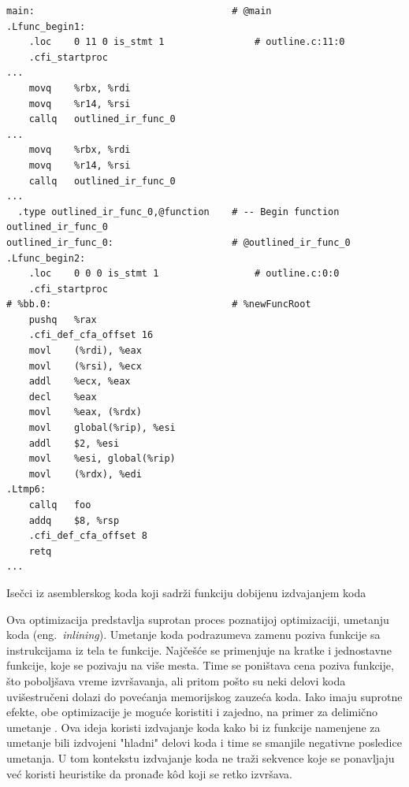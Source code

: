 \documentclass[12pt,oneside]{memoir}
\begin{document}
\begin{listing}[!ht]
\begin{verbatim}
main:                                   # @main
.Lfunc_begin1:
	.loc	0 11 0 is_stmt 1                # outline.c:11:0
	.cfi_startproc
...
	movq	%rbx, %rdi
	movq	%r14, %rsi
	callq	outlined_ir_func_0
...
	movq	%rbx, %rdi
	movq	%r14, %rsi
	callq	outlined_ir_func_0
...
  .type	outlined_ir_func_0,@function    # -- Begin function outlined_ir_func_0
outlined_ir_func_0:                     # @outlined_ir_func_0
.Lfunc_begin2:
	.loc	0 0 0 is_stmt 1                 # outline.c:0:0
	.cfi_startproc
# %bb.0:                                # %newFuncRoot
	pushq	%rax
	.cfi_def_cfa_offset 16
	movl	(%rdi), %eax
	movl	(%rsi), %ecx
	addl	%ecx, %eax
	decl	%eax
	movl	%eax, (%rdx)
	movl	global(%rip), %esi
	addl	$2, %esi
	movl	%esi, global(%rip)
	movl	(%rdx), %edi
.Ltmp6:
	callq	foo
	addq	$8, %rsp
	.cfi_def_cfa_offset 8
	retq
...
\end{verbatim}
\caption{Isečci iz asemblerskog koda koji sadrži funkciju dobijenu izdvajanjem koda}
\label{lst:outline_program_asm}
\end{listing}

Ova optimizacija predstavlja suprotan proces poznatijoj optimizaciji, umetanju koda (eng.~{\em inlining}).
Umetanje koda podrazumeva zamenu poziva funkcije sa instrukcijama iz tela te funkcije.
Najčešće se primenjuje na kratke i jednostavne funkcije, koje se pozivaju na više mesta.
Time se poništava cena poziva funkcije, što poboljšava vreme izvršavanja, ali pritom pošto su neki delovi koda uvišestručeni dolazi do povećanja memorijskog zauzeća koda.
Iako imaju suprotne efekte, obe optimizacije je moguće koristiti i zajedno, na primer za delimično umetanje \cite{Zhao2005FunctionOA}.
Ova ideja koristi izdvajanje koda kako bi iz funkcije namenjene za umetanje bili izdvojeni "hladni" delovi koda i time se smanjile negativne posledice umetanja.
U tom kontekstu izdvajanje koda ne traži sekvence koje se ponavljaju već koristi heuristike da pronađe k\^od koji se retko izvršava.
\end{document}
